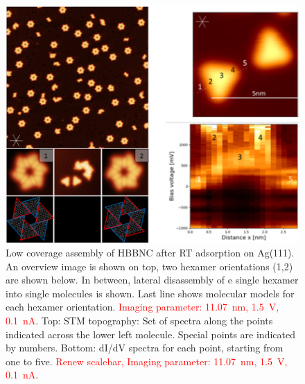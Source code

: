 \begin{figure}[]\centering
	\includegraphics[width=\textwidth]{./images/test}
	\caption{Low coverage assembly of HBBNC after RT adsorption on Ag(111). An overview image is shown on top, two hexamer orientations (1,2) are shown below. In between, lateral disassembly of e single hexamer into single molecules is shown. Last line shows molecular models for each hexamer orientation. \textcolor{red}{Imaging parameter: \SI{11.07}{\nano \meter}, \SI{1.5}{\volt}, \SI{0.1}{\nano \ampere}}. Top: STM topography: Set of spectra along the points indicated across the lower left molecule. Special points are indicated by numbers. Bottom: dI/dV spectra for each point, starting from one to five. \textcolor{red}{Renew scalebar, Imaging parameter: \SI{11.07}{\nano \meter}, \SI{1.5}{\volt}, \SI{0.1}{\nano \ampere}}.}
	\label{fig:HBC+HBBNC-electronics}
\end{figure}

%

